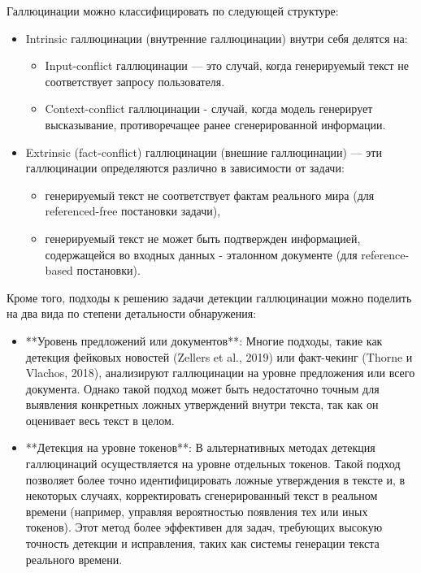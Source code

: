 \documentclass[12pt]{article}
\begin{document}
Галлюцинации можно классифицировать по следующей структуре:
    \begin{itemize}
        \item Intrinsic галлюцинации (внутренние галлюцинации) внутри себя делятся на:
        \begin{itemize}
            \item Input-conflict галлюцинации
        — это случай, когда генерируемый текст не соответствует запросу пользователя. 
            \item Context-conflict галлюцинации - случай, когда модель генерирует высказывание, противоречащее ранее сгенерированной информации.
        \end{itemize}
        
        \item Extrinsic (fact-conflict) галлюцинации (внешние галлюцинации) — эти галлюцинации определяются различно в зависимости от задачи:
            \begin{itemize}
                \item генерируемый текст не соответствует фактам реального мира (для referenced-free постановки задачи),
                \item генерируемый текст не может быть подтвержден информацией, содержащейся во входных данных - эталонном документе (для reference-based постановки).
            \end{itemize}
    \end{itemize}

Кроме того, подходы к решению задачи детекции галлюцинации можно поделить на два вида по степени детальности обнаружения:
\begin{itemize}
   \item **Уровень предложений или документов**: Многие подходы, такие как детекция фейковых новостей (Zellers et al., 2019) или факт-чекинг (Thorne и Vlachos, 2018), анализируют галлюцинации на уровне предложения или всего документа. Однако такой подход может быть недостаточно точным для выявления конкретных ложных утверждений внутри текста, так как он оценивает весь текст в целом.
   \item **Детекция на уровне токенов**: В альтернативных методах детекция галлюцинаций осуществляется на уровне отдельных токенов. Такой подход позволяет более точно идентифицировать ложные утверждения в тексте и, в некоторых случаях, корректировать сгенерированный текст в реальном времени (например, управляя вероятностью появления тех или иных токенов). Этот метод более эффективен для задач, требующих высокую точность детекции и исправления, таких как системы генерации текста реального времени.
\end{itemize}
\end{document}
